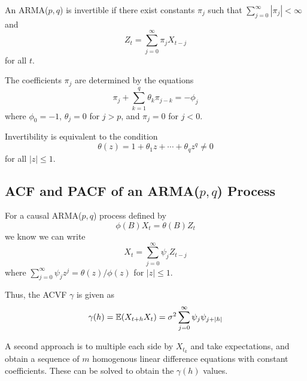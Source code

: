 \begin{defn}
  \label{defn:arma_processes:5}
  An ARMA($p, q$) is invertible if there exist constants $\pi_{j}$
  such that $\sum_{j=0}^{\infty} |\pi_{j}| < \infty$ and
  \begin{equation}
    \label{eq:23}
    Z_{t} = \sum_{j=0}^{\infty} \pi_{j} X_{t-j}
  \end{equation} for all $t$.

  The coefficients $\pi_{j}$ are determined by the equations
  \begin{equation}
    \label{eq:26}
    \pi_{j} + \sum_{k=1}^{q} \theta_{k} \pi_{j-k} = -\phi_{j}
  \end{equation}
  where $\phi_{0} = -1$, $\theta_{j} = 0$ for $j > p$, and $\pi_{j} =
  0$ for $j < 0$.
\end{defn}

\begin{thm}
  \label{defn:arma_processes:6}
  Invertibility is equivalent to the condition
  \begin{equation}
    \label{eq:24}
    \theta(z) = 1 + \theta_{1}z + \cdots + \theta_{q} z^{q} \neq 0
  \end{equation} for all $|z| \leq 1$.
\end{thm}

\subsection{ACF and PACF of an ARMA($p, q$) Process}
\label{sec:acf-pacf-an}

\begin{thm}
  \label{defn:arma_processes:7}
  For a causal ARMA($p, q$) process defined by
  \begin{equation}
    \label{eq:28}
    \phi(B) X_{t} = \theta(B) Z_{t}
  \end{equation} we know we can write
  \begin{equation}
    \label{eq:29}
    X_{t} = \sum_{j=0}^{\infty} \psi_{j} Z_{t-j}
  \end{equation} where $\sum_{j=0}^{\infty} \psi_{j} z^{j} = \theta(z)
  / \phi(z)$ for $|z| \leq 1$.

  Thus, the ACVF $\gamma$ is given as
  \begin{equation}
    \label{eq:30}
    \gamma(h) = \E{X_{t+h} X_{t}} = \sigma^{2} \sum_{j=0}^{\infty}
    \psi_{j} \psi_{j+|h|}
  \end{equation}

  A second approach is to multiple each side by $X_{t_k}$ and take
  expectations, and obtain a sequence of $m$ homogenous linear
  difference equations with constant coefficients.  These can be
  solved to obtain the $\gamma(h)$ values. 
\end{thm}


